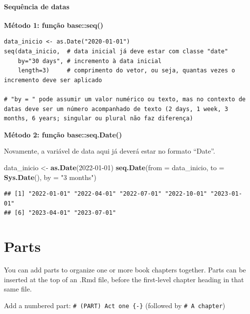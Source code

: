 \documentclass[
]{book}
\newenvironment{Shaded}{\begin{snugshade}}{\end{snugshade}}
\newcommand{\AttributeTok}[1]{\textcolor[rgb]{0.13,0.29,0.53}{#1}}
\newcommand{\FunctionTok}[1]{\textcolor[rgb]{0.13,0.29,0.53}{\textbf{#1}}}
\newcommand{\NormalTok}[1]{#1}
\newcommand{\OtherTok}[1]{\textcolor[rgb]{0.56,0.35,0.01}{#1}}
\newcommand{\StringTok}[1]{\textcolor[rgb]{0.31,0.60,0.02}{#1}}
\theoremstyle{definition}
\theoremstyle{definition}
\theoremstyle{definition}
\theoremstyle{definition}
\theoremstyle{remark}
\begin{document}
\hypertarget{sequuxeancia-de-datas}{%
\subsubsection{Sequência de datas}\label{sequuxeancia-de-datas}}

\textbf{Método 1: função base::seq()}

\begin{verbatim}
data_inicio <- as.Date("2020-01-01")
seq(data_inicio,  # data inicial já deve estar com classe "date"
    by="30 days", # incremento à data inicial
    length=3)     # comprimento do vetor, ou seja, quantas vezes o incremento deve ser aplicado
    
# "by = " pode assumir um valor numérico ou texto, mas no contexto de datas deve ser um número acompanhado de texto (2 days, 1 week, 3 months, 6 years; singular ou plural não faz diferença) 
\end{verbatim}

\textbf{Método 2: função base::seq.Date()}

Novamente, a variável de data aqui já deverá estar no formato ``Date''.

\begin{Shaded}
\begin{Highlighting}[]
\NormalTok{data\_inicio }\OtherTok{\textless{}{-}} \FunctionTok{as.Date}\NormalTok{(}\StringTok{\textquotesingle{}2022{-}01{-}01\textquotesingle{}}\NormalTok{)}
\FunctionTok{seq.Date}\NormalTok{(}\AttributeTok{from =}\NormalTok{ data\_inicio, }\AttributeTok{to =} \FunctionTok{Sys.Date}\NormalTok{(), }\AttributeTok{by =} \StringTok{"3 months"}\NormalTok{)}
\end{Highlighting}
\end{Shaded}

\begin{verbatim}
## [1] "2022-01-01" "2022-04-01" "2022-07-01" "2022-10-01" "2023-01-01"
## [6] "2023-04-01" "2023-07-01"
\end{verbatim}

\hypertarget{parts}{%
\chapter{Parts}\label{parts}}

You can add parts to organize one or more book chapters together. Parts can be inserted at the top of an .Rmd file, before the first-level chapter heading in that same file.

Add a numbered part: \texttt{\#\ (PART)\ Act\ one\ \{-\}} (followed by \texttt{\#\ A\ chapter})
\end{document}
